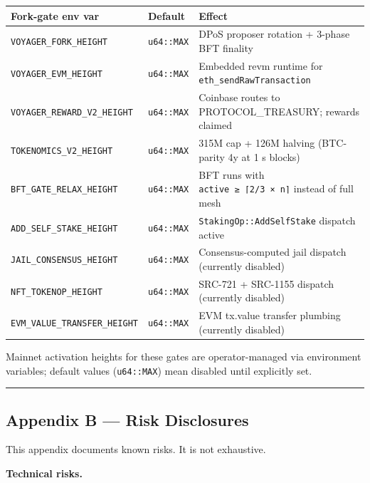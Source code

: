 \documentclass[11pt,a4paper]{article}
\begin{document}
\begin{longtable}[]{@{}lll@{}}
\toprule\noalign{}
Fork-gate env var & Default & Effect \\
\midrule\noalign{}
\endhead
\bottomrule\noalign{}
\endlastfoot
\texttt{VOYAGER\_FORK\_HEIGHT} & \texttt{u64::MAX} & DPoS proposer
rotation + 3-phase BFT finality \\
\texttt{VOYAGER\_EVM\_HEIGHT} & \texttt{u64::MAX} & Embedded revm
runtime for \texttt{eth\_sendRawTransaction} \\
\texttt{VOYAGER\_REWARD\_V2\_HEIGHT} & \texttt{u64::MAX} & Coinbase
routes to PROTOCOL\_TREASURY; rewards claimed \\
\texttt{TOKENOMICS\_V2\_HEIGHT} & \texttt{u64::MAX} & 315M cap + 126M
halving (BTC-parity 4y at 1 s blocks) \\
\texttt{BFT\_GATE\_RELAX\_HEIGHT} & \texttt{u64::MAX} & BFT runs with
\texttt{active\ ≥\ ⌈2/3\ ×\ n⌉} instead of full mesh \\
\texttt{ADD\_SELF\_STAKE\_HEIGHT} & \texttt{u64::MAX} &
\texttt{StakingOp::AddSelfStake} dispatch active \\
\texttt{JAIL\_CONSENSUS\_HEIGHT} & \texttt{u64::MAX} &
Consensus-computed jail dispatch (currently disabled) \\
\texttt{NFT\_TOKENOP\_HEIGHT} & \texttt{u64::MAX} & SRC-721 + SRC-1155
dispatch (currently disabled) \\
\texttt{EVM\_VALUE\_TRANSFER\_HEIGHT} & \texttt{u64::MAX} & EVM tx.value
transfer plumbing (currently disabled) \\
\end{longtable}

Mainnet activation heights for these gates are operator-managed via
environment variables; default values (\texttt{u64::MAX}) mean disabled
until explicitly set.

\begin{center}\rule{0.5\linewidth}{0.5pt}\end{center}

\hypertarget{appendix-b--risk-disclosures}{%
\subsection{Appendix B --- Risk
Disclosures}\label{appendix-b--risk-disclosures}}

This appendix documents known risks. It is not exhaustive.

\textbf{Technical risks.}
\end{document}
